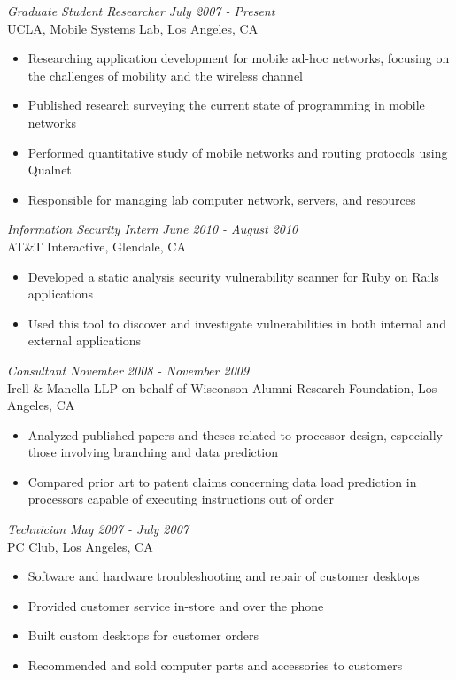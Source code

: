 \documentclass[margin]{res}
\begin{document}
\begin{resume}
{\sl Graduate Student Researcher} \hfill \textit{July 2007 - Present} \\
		UCLA, \href{http://msl.cs.ucla.edu}{Mobile Systems Lab}, Los Angeles, CA
		\begin{itemize}  \itemsep -2pt %
		\item Researching application development for mobile ad-hoc networks, focusing on the challenges of mobility and the wireless channel
		\item Published research surveying the current state of programming in mobile networks
		\item Performed quantitative study of mobile networks and routing protocols using Qualnet
		\item Responsible for managing lab computer network, servers, and resources
		\end{itemize}

{\sl Information Security Intern} \hfill \textit{June 2010 - August 2010} \\
		AT\&T Interactive, Glendale, CA
		\begin{itemize}  \itemsep -2pt %
		\item Developed a static analysis security vulnerability scanner for Ruby on Rails applications
		\item Used this tool to discover and investigate vulnerabilities in both internal and external applications
		\end{itemize}

{\sl Consultant} \hfill \textit{November 2008 - November 2009} \\
		Irell \& Manella LLP on behalf of Wisconson Alumni Research Foundation, Los Angeles, CA
		\begin{itemize}  \itemsep -2pt %
		\item Analyzed published papers and theses related to processor design, especially those involving branching and data prediction
		\item Compared prior art to patent claims concerning data load prediction in processors capable of executing instructions out of order
		\end{itemize}

{\sl Technician} \hfill \textit{May 2007 - July 2007} \\
		PC Club, Los Angeles, CA
		\begin{itemize}  \itemsep -2pt %
		\item Software and hardware troubleshooting and repair of customer desktops
		\item Provided customer service in-store and over the phone
		\item Built custom desktops for customer orders
		\item Recommended and sold computer parts and accessories to customers
		\end{itemize}


\end{resume}
\end{document}
